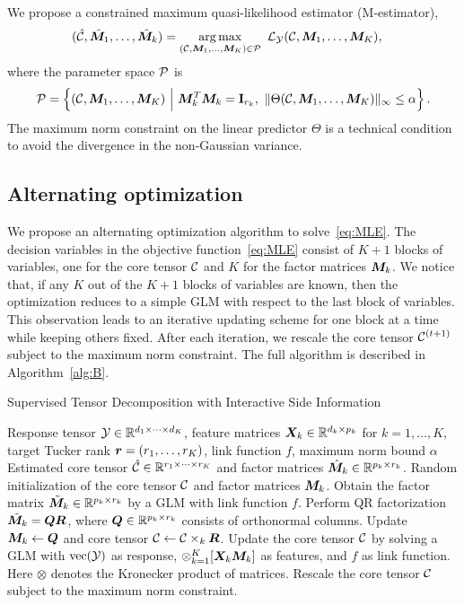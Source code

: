 \documentclass[12pt]{article}
\theoremstyle{definition}
\theoremstyle{definition}
\begin{document}
We propose a constrained maximum quasi-likelihood estimator (M-estimator),
\begin{align} \label{eq:MLE} 
(\hat \tC, \hat \mM_1,\ldots,\hat \mM_k) &=\argmax_{(\tC,\mM_1,\ldots,\mM_K)\in \tP} \ \tL_{\tY}(\tC,\mM_1,\ldots,\mM_K),
\end{align}
where the parameter space $\mathcal{P}$ is
\[
\tP=\left\{(\tC, \mM_1,\ldots,\mM_K) \ \Big| \ \mM_k^T\mM_k=\mathbf{I}_{r_k},\ \mnormSize{}{\Theta(\tC,\mM_1,\ldots,\mM_K)}\leq \alpha \right\}.
\]
The maximum norm constraint on the linear predictor $\Theta$ is a technical condition to avoid the divergence in the non-Gaussian variance.


\subsection{Alternating optimization} \label{subsec:alg}
We propose an alternating optimization algorithm to solve~\eqref{eq:MLE}. 
The decision variables in the objective function~\eqref{eq:MLE} consist of $K+1$ blocks of variables, one for the core tensor $\mathcal{C}$ and $K$ for the factor matrices $\bm M_k$. We notice that, if any $K$ out of the $K+1$ blocks of variables are known, then the optimization reduces to a simple GLM with respect to the last block of variables. This observation leads to an iterative updating scheme for one block at a time while keeping others fixed. After each iteration, we rescale the core tensor $\mathcal{C}^{(t+1)}$ subject to the maximum norm constraint. The full algorithm is described in Algorithm~\ref{alg:B}. 



\begin{algorithm}[t]
\caption{Supervised Tensor Decomposition with Interactive Side Information}\label{alg:B}
\begin{algorithmic}[1]
\INPUT Response tensor $\mathcal{Y}\in \mathbb{R}^{d_1\times \cdots \times d_K}$, feature matrices $\bm X_k\in\mathbb{R}^{d_k\times p_k}$ for $k=1,\ldots,K$, target Tucker rank $\bm{r}=(r_1,\ldots,r_K)$, link function $f$, maximum norm bound $\alpha$
\OUTPUT Estimated core tensor $\hat {\mathcal{C}}\in\mathbb{R}^{r_1\times \cdots \times r_K}$ and factor matrices $\hat {\bm M}_k\in\mathbb{R}^{p_k\times r_k}$. 
\State Random initialization of the core tensor $\mathcal{C}$ and factor matrices $\bm M_k$. 
\State Obtain the factor matrix $\tilde {\bm M}_k\in\mathbb{R}^{p_k\times r_k}$ by a GLM with link function $f$.
\State Perform QR factorization $\tilde {\bm M}_k=\bm{Q}\bm{R}$, where $\bm{Q}\in\mathbb{R}^{p_k\times r_k}$ consists of orthonormal columns. 
\State Update $\bm M_k\leftarrow \bm{Q}$ and core tensor $\mathcal{C}\leftarrow \mathcal{C}\times_k \bm{R}$.
\EndFor
\State Update the core tensor $\mathcal{C}$ by solving a GLM with $\textup{vec}(\mathcal{Y})$ as response, $\otimes_{k=1}^K[ \bm X_k\bm M_k]$ as features, and $f$ as link function. Here $\otimes$ denotes the Kronecker product of matrices. 
\State Rescale the core tensor $\mathcal{C}$ subject to the maximum norm constraint. 
\EndWhile
\end{algorithmic}
\end{algorithm}
\end{document}
